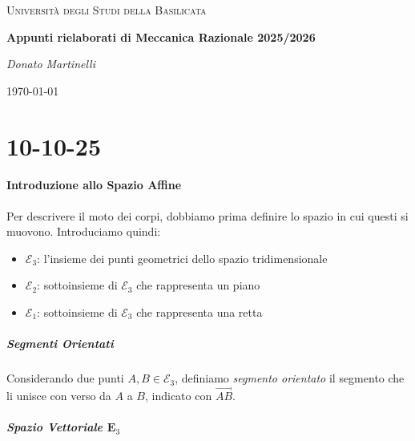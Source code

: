 \documentclass{article}
\theoremstyle{plain}
\theoremstyle{definition}
\theoremstyle{remark}
\begin{document}
\begin{titlepage}
    \centering
	{\textsc{Università degli Studi della Basilicata} \par}
	\vspace{2cm}
    {\huge\bfseries Appunti rielaborati di Meccanica Razionale 2025/2026\par}
    \vfill
	{\Large\itshape Donato Martinelli\par}
	{\large \today\par}
\end{titlepage}


\newpage 

\section{10-10-25}

\paragraph{Introduzione allo Spazio Affine}

Per descrivere il moto dei corpi, dobbiamo prima definire lo spazio in cui questi si muovono. Introduciamo quindi:

\begin{itemize}
    \item $\mathcal{E}_3$: l'insieme dei punti geometrici dello spazio tridimensionale
    \item $\mathcal{E}_2$: sottoinsieme di $\mathcal{E}_3$ che rappresenta un piano
    \item $\mathcal{E}_1$: sottoinsieme di $\mathcal{E}_3$ che rappresenta una retta
\end{itemize}

\subparagraph{Segmenti Orientati}

Considerando due punti $A,B \in \mathcal{E}_3$, definiamo \emph{segmento orientato} il segmento che li unisce con verso da $A$ a $B$, indicato con $\overrightarrow{AB}$.

\begin{center}
\end{center}

\subparagraph{Spazio Vettoriale $\mathbf{E}_3$}
\end{document}

